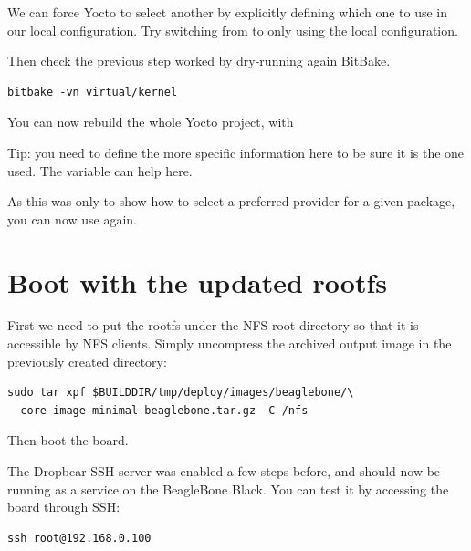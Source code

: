 
We can force Yocto to select another  by explicitly
defining which one to use in our local configuration. Try switching
from  to  only using the
local configuration.

Then check the previous step worked by dry-running again BitBake.
\begin{verbatim}
bitbake -vn virtual/kernel
\end{verbatim}

You can now rebuild the whole Yocto project, with 

Tip: you need to define the more specific information here to be sure it is the
one used. The  variable can help here.

As this was only to show how to select a preferred provider for a
given package, you can now use  again.

\section{Boot with the updated rootfs}

First we need to put the rootfs under the NFS root directory so that it is
accessible by NFS clients. Simply uncompress the archived output image in the
previously created  directory:
\begin{verbatim}
sudo tar xpf $BUILDDIR/tmp/deploy/images/beaglebone/\
  core-image-minimal-beaglebone.tar.gz -C /nfs
\end{verbatim}

Then boot the board.

The Dropbear SSH server was enabled a few steps before, and should now be
running as a service on the BeagleBone Black. You can test it by accessing the
board through SSH:
\begin{verbatim}
ssh root@192.168.0.100
\end{verbatim}

